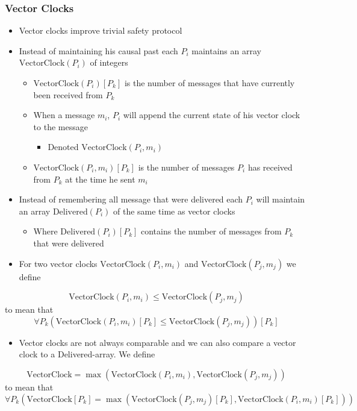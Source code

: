 \documentclass[11pt]{article}
\begin{document}
\subsubsection{Vector Clocks}
\label{sec:org7dfe0a4}
\begin{itemize}
\item Vector clocks improve trivial safety protocol

\item Instead of maintaining his causal past each \(P_i\) maintains an array \(\text{VectorClock}(P_i)\) of integers
\begin{itemize}
\item \(\text{VectorClock}(P_i)[P_k]\) is the number of messages that have currently been received from \(P_k\)
\item When a message \(m_i\), \(P_i\) will append the current state of his vector clock to the message
\begin{itemize}
\item Denoted \(\text{VectorClock}(P_i,m_i)\)
\end{itemize}
\item \(\text{VectorClock}(P_i,m_i)[P_k]\) is the number of messages \(P_i\) has received from \(P_k\)  at the time he sent \(m_i\)
\end{itemize}

\item Instead of remembering all message that were delivered each \(P_i\) will maintain an array \(\text{Delivered}(P_i)\) of the same time as vector clocks
\begin{itemize}
\item Where \(\text{Delivered}(P_i)[P_k]\) contains the number of messages from \(P_k\) that were delivered
\end{itemize}

\item For two vector clocks \(\text{VectorClock}(P_i,m_i)\) and \(\text{VectorClock}(P_j,m_j)\) we define
\end{itemize}
\begin{equation}
  \text{VectorClock}(P_i,m_i) \leq \text{VectorClock}(P_j,m_j)
\end{equation}
to mean that
\begin{equation}
  \forall P_k (\text{VectorClock}(P_i,m_i)[P_k] \leq \text{VectorClock}(P_j,m_j))[P_k]
\end{equation}

\begin{itemize}
\item Vector clocks are not always comparable  and we can also compare a vector clock to a Delivered-array. We define
\end{itemize}
\begin{equation}
	\text{VectorClock} = \max(\text{VectorClock}(P_i,m_i), \text{VectorClock}(P_j,m_j))
\end{equation}
to mean that
\begin{equation}
    \forall P_k (\text{VectorClock}[P_k] = \max(\text{VectorClock}(P_j,m_j)[P_k], \text{VectorClock}(P_i,m_i)[P_k]))
\end{equation}
\end{document}
